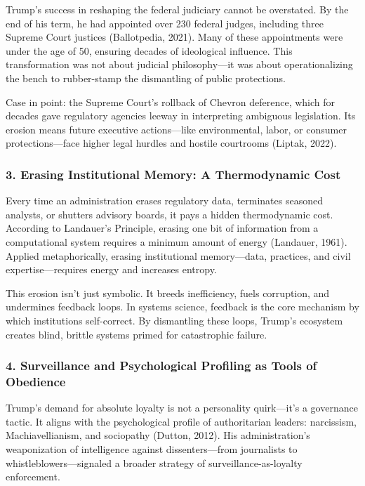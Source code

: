 \documentclass[
]{article}
\begin{document}
Trump's success in reshaping the federal judiciary cannot be overstated. By the end of his term, he had appointed over 230 federal judges, including three Supreme Court justices (Ballotpedia, 2021). Many of these appointments were under the age of 50, ensuring decades of ideological influence. This transformation was not about judicial philosophy---it was about operationalizing the bench to rubber-stamp the dismantling of public protections.

Case in point: the Supreme Court's rollback of Chevron deference, which for decades gave regulatory agencies leeway in interpreting ambiguous legislation. Its erosion means future executive actions---like environmental, labor, or consumer protections---face higher legal hurdles and hostile courtrooms (Liptak, 2022).

\subsubsection{\texorpdfstring{3. \textbf{Erasing Institutional Memory: A Thermodynamic Cost}}{3. Erasing Institutional Memory: A Thermodynamic Cost}}\label{erasing-institutional-memory-a-thermodynamic-cost}

Every time an administration erases regulatory data, terminates seasoned analysts, or shutters advisory boards, it pays a hidden thermodynamic cost. According to Landauer's Principle, erasing one bit of information from a computational system requires a minimum amount of energy (Landauer, 1961). Applied metaphorically, erasing institutional memory---data, practices, and civil expertise---requires energy and increases entropy.

This erosion isn't just symbolic. It breeds inefficiency, fuels corruption, and undermines feedback loops. In systems science, feedback is the core mechanism by which institutions self-correct. By dismantling these loops, Trump's ecosystem creates blind, brittle systems primed for catastrophic failure.

\subsubsection{\texorpdfstring{4. \textbf{Surveillance and Psychological Profiling as Tools of Obedience}}{4. Surveillance and Psychological Profiling as Tools of Obedience}}\label{surveillance-and-psychological-profiling-as-tools-of-obedience}

Trump's demand for absolute loyalty is not a personality quirk---it's a governance tactic. It aligns with the psychological profile of authoritarian leaders: narcissism, Machiavellianism, and sociopathy (Dutton, 2012). His administration's weaponization of intelligence against dissenters---from journalists to whistleblowers---signaled a broader strategy of surveillance-as-loyalty enforcement.
\end{document}
